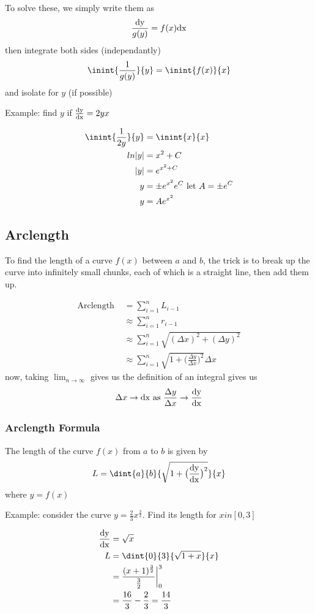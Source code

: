 \documentclass[12pt]{article}
\begin{document}
To solve these, we simply write them as \[ \frac{{\rm dy}}{g(y)} = f(x){\rm dx} \] then integrate both sides (independantly) \[ \inint{\frac{1}{g(y)}}{y} = \inint{f(x)}{x} \] and isolate for $y$ (if possible)

Example: find $y$ if $\frac{{\rm dy}}{{\rm dx}} = 2yx$

\begin{align*}
\inint{\frac{1}{2y}}{y} &= \inint{x}{x}\\
ln|y| &= x^2 + C\\
|y| &= e^{x^2 + C}\\
y &= \pm e^{x^2}e^C \text{ let $A = \pm e^C$}\\
y &= Ae^{x^2}
\end{align*}

\subsection*{Arclength}
To find the length of a curve $f(x)$ between $a$ and $b$, the trick is to break up the curve into infinitely small chunks, each of which is a straight line, then add them up.

\begin{align*}
\text{Arclength } &= \sum_{i=1}^n L_{i-1}\\
&\approx \sum_{i=1}^n r_{i-1}\\
&\approx \sum_{i=1}^n \sqrt{(\Delta x)^2 + (\Delta y)^2}\\
&\approx \sum_{i=1}^n \sqrt{1+\bigl(\frac{\Delta y}{\Delta x}\bigl)^2} \Delta x
\end{align*}
now, taking $\displaystyle\lim_{n\to\infty}$ gives us the definition of an integral gives us \[ \Delta x \to {\rm dx\ as\ } \frac{\Delta y}{\Delta x} \to \frac{{\rm dy}}{{\rm dx}} \]

\subsubsection*{Arclength Formula}
The length of the curve $f(x)$ from $a$ to $b$ is given by \[ L = \dint{a}{b}{\sqrt{1+\bigl(\frac{{\rm dy}}{{\rm dx}}\bigl)^2}}{x} \] where $y = f(x)$

Example: consider the curve $y = \frac{2}{3}x^{\frac{3}{2}}$. Find its length for $xin [0,3]$

\begin{align*}
\frac{{\rm dy}}{{\rm dx}} &= \sqrt{x}\\
L &= \dint{0}{3}{\sqrt{1+x}}{x}\\
&= \frac{(x+1)^{\frac{3}{2}}}{\frac{3}{2}} \bigg|_0^3\\
&= \frac{16}{3} - \frac{2}{3} = \frac{14}{3}
\end{align*}
\end{document}
